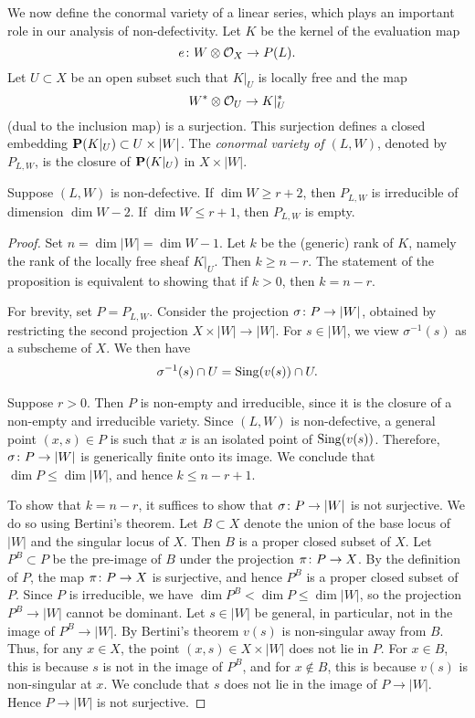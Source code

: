 We now define the conormal variety of a linear series, which plays an important role in our analysis of non-defectivity.
Let $K$ be the kernel of the evaluation map
\[ e \from W \otimes \O_X \to P(L).\]
Let $U \subset X$ be an open subset such that $K|_U$ is locally free and the map
\[W^* \otimes \O_U \to K|_U^*\]
(dual to the inclusion map) is a surjection.
This surjection defines a closed embedding $\P(K|_U) \subset U \times |W|$.
The \emph{conormal variety of $(L,W)$}, denoted by $P_{L,W}$, is the closure of $\P(K|_U)$ in $X \times |W|$.

\begin{proposition}\label{prop:dimension}
  \label{prop:dimP}
  Suppose $(L, W)$ is non-defective.
  If $\dim W \geq r+2$, then $P_{L,W}$ is irreducible of dimension $\dim W - 2$.
  If $\dim W \leq r+1$, then $P_{L,W}$ is empty.
\end{proposition} 

\begin{proof}
  Set $n = \dim |W| = \dim W - 1$.
  Let $k$ be the (generic) rank of $K$, namely the rank of the locally free sheaf $K|_U$.
  Then $k \geq n-r$.
  The statement of the proposition is equivalent to showing that if $k > 0$, then $k = n-r$.

  For brevity, set $P = P_{L,W}$.
  Consider the projection $\sigma \from P \to |W|$, obtained by restricting the second projection $X \times |W| \to |W|$.
  For $s \in |W|$, we view $\sigma^{-1}(s)$ as a subscheme of $X$.
  We then have
  \begin{align*}
    \sigma^{-1}(s) \cap U = \sing(v(s)) \cap U.
  \end{align*}

  Suppose $r>0$.
  Then $P$ is non-empty and irreducible, since it is the closure of a non-empty and irreducible variety.
  Since $(L,W)$ is non-defective, a general point $(x,s) \in P$ is such that $x$ is an isolated point of $\sing(v(s))$.
  Therefore, $\sigma \from P \to |W|$ is generically finite onto its image.
  We conclude that $\dim P \leq \dim |W|$, and hence $k \leq n-r+1$.

  To show that $k = n-r$, it suffices to show that $\sigma \from P \to |W|$ is not surjective.
  We do so using Bertini's theorem.
  Let $B \subset X$ denote the union of the base locus of $|W|$ and the singular locus of $X$.
  Then $B$ is a proper closed subset of $X$.
  Let $P^B \subset P$ be the pre-image of $B$ under the projection $\pi \from P \to X$.
  By the definition of $P$, the map $\pi \from P \to X$ is surjective, and hence $P^B$ is a proper closed subset of $P$.
  Since $P$ is irreducible, we have $\dim P^B < \dim P \leq \dim |W|$, so the projection $P^B \to |W|$ cannot be dominant.
  Let $s \in |W|$ be general, in particular, not in the image of $P^B \to |W|$.
  By Bertini's theorem $v(s)$ is non-singular away from $B$.
  Thus, for any $x \in X$, the point $(x, s) \in X \times |W|$ does not lie in $P$.
  For $x \in B$, this is because $s$ is not in the image of $P^B$, and for $x \not \in B$, this is because $v(s)$ is non-singular at $x$.
  We conclude that $s$ does not lie in the image of $P \to |W|$.
  Hence $P \to |W|$ is not surjective.
\end{proof} 

